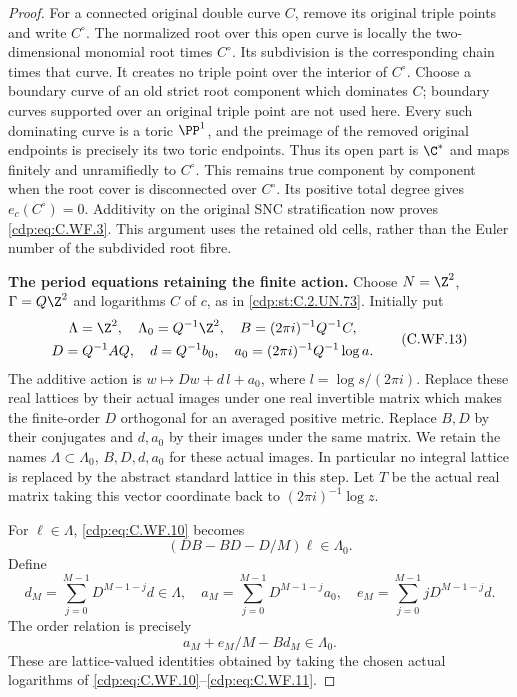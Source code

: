 \begin{proof}
For a connected original double curve \(C\), remove its
original triple points and write \(C^\circ\).  The normalized
root over this open curve is locally the two-dimensional
monomial root times \(C^\circ\).  Its subdivision is the
corresponding chain times that curve.  It creates no triple
point over the interior of \(C^\circ\).  Choose a boundary
curve of an old strict root component which dominates \(C\);
boundary curves supported over an original triple point
are not used here.  Every such dominating curve is a toric
\(\PP^1\), and the
preimage of the removed original endpoints is precisely
its two toric endpoints.  Thus its open part is \(\C^*\)
and maps finitely and unramifiedly to \(C^\circ\).
This remains true component by component when the root
cover is disconnected over \(C^\circ\).  Its positive total
degree gives \(e_c(C^\circ)=0\).  Additivity on the original
SNC stratification now proves \eqref{cdp:eq:C.WF.3}.  This argument
uses the retained old cells, rather than the Euler number
of the subdivided root fibre.

\par\medskip\noindent\textbf{The period equations retaining the finite action.}
Choose \(N=\Z^2\), \(\Gamma=Q\Z^2\) and logarithms \(C\)
of \(c\), as in \ref{cdp:st:C.2.UN.73}.  Initially put
\[
 \begin{gathered}
 \Lambda= \Z^2,\quad \Lambda_0=Q^{-1}\Z^2,\quad
 B=(2\pi i)^{-1}Q^{-1}C,\\
 D=Q^{-1}AQ,\quad
 d=Q^{-1}b_0,\quad
 a_0=(2\pi i)^{-1}Q^{-1}\log a .
 \end{gathered}
\tag{C.WF.13}\label{cdp:eq:C.WF.13}
\]
The additive action is \(w\mapsto Dw+d\,l+a_0\),
where \(l=\log s/(2\pi i)\).  Replace these real lattices
by their actual images under one real invertible matrix
which makes the finite-order \(D\) orthogonal for an
averaged positive metric.  Replace \(B,D\) by their
conjugates and \(d,a_0\) by their images under the same
matrix.  We retain the names
\(\Lambda\subset\Lambda_0\), \(B,D,d,a_0\) for these
actual images.  In particular no integral lattice is
replaced by the abstract standard lattice in this step.
Let \(T\) be the actual real matrix taking this vector
coordinate back to \((2\pi i)^{-1}\log z\).

For \(\ell\in\Lambda\), \eqref{cdp:eq:C.WF.10} becomes
\[
       (DB-BD-D/M)\ell\in\Lambda_0.
\tag{C.WF.14}\label{cdp:eq:C.WF.14}
\]
Define
\[
 d_M=\sum_{j=0}^{M-1}D^{M-1-j}d\in\Lambda,\quad
 a_M=\sum_{j=0}^{M-1}D^{M-1-j}a_0,\quad
 e_M=\sum_{j=0}^{M-1}jD^{M-1-j}d .
\]
The order relation is precisely
\[
                   a_M+e_M/M-Bd_M\in\Lambda_0 .
\tag{C.WF.15}\label{cdp:eq:C.WF.15}
\]
These are lattice-valued identities obtained by taking
the chosen actual logarithms of \eqref{cdp:eq:C.WF.10}--\eqref{cdp:eq:C.WF.11}.


\end{proof}

